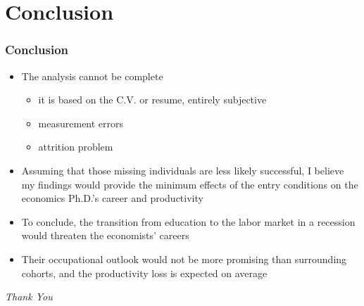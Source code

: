 \documentclass[10pt,svgnames,fragile]{beamer}
\begin{document}
\section{Conclusion}
\begin{frame}
	\frametitle{Conclusion}
	\begin{itemize}
		\item The analysis cannot be complete
		\begin{itemize}
			\item it is based on the C.V. or resume, entirely subjective
			\vspace{1 mm}
			\item measurement errors
			\vspace{1 mm}
			\item attrition problem
		\end{itemize}
	\vfill
		\item Assuming that those missing individuals are less likely successful, I believe my findings would provide 	the minimum effects of the entry conditions on the economics Ph.D.'s career and productivity
		\vfill
		\item To conclude, the transition from education to the labor market in a recession would threaten the economists' careers
		\vfill
		\item Their occupational outlook would not be more 		promising than surrounding cohorts, and the productivity loss is expected on average
\vfill	
\end{itemize}
\end{frame}

\begin{frame}{}
	\centering \Huge
	\emph{Thank You}
\end{frame}

\end{document}
